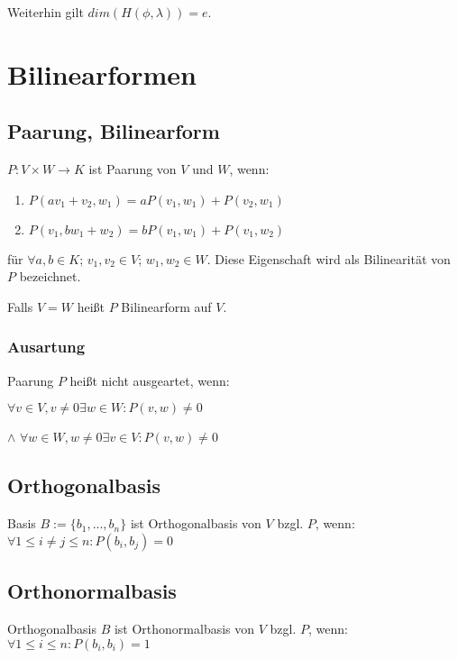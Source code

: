 Weiterhin gilt $dim(H(\phi, \lambda))=e$.

\section*{Bilinearformen}

\subsection*{Paarung, Bilinearform}

$P : V \times W \rightarrow K$ ist Paarung von $V$ und $W$, wenn:

\begin{enumerate}[label=(\alph*)]
	\item $P(av_1 + v_2, w_1) = aP(v_1, w_1) + P(v_2, w_1)$
	\item $P(v_1, bw_1 + w_2) = bP(v_1, w_1) + P(v_1, w_2)$
\end{enumerate}

für $\forall a, b \in K$; $v_1, v_2 \in V$; $w_1, w_2 \in W$. Diese Eigenschaft wird als Bilinearität von $P$ bezeichnet.

Falls $V=W$ heißt $P$ Bilinearform auf $V$.

\subsubsection*{Ausartung}

Paarung $P$ heißt nicht ausgeartet, wenn:

\hspace*{2mm}
$\forall v \in V, v \neq 0 \exists w \in W : P(v, w) \neq 0$

$\land$ $\forall w \in W, w \neq 0 \exists v \in V : P(v, w) \neq 0$

\subsection*{Orthogonalbasis}

Basis $B := \{b_1, ..., b_n\}$ ist Orthogonalbasis von $V$ bzgl. $P$, wenn: $\forall 1 \leq i \neq j \leq n : P(b_i, b_j) = 0$

\subsection*{Orthonormalbasis}

Orthogonalbasis $B$ ist Orthonormalbasis von $V$ bzgl. $P$, wenn: $\forall 1 \leq i \leq n : P(b_i, b_i) = 1$

